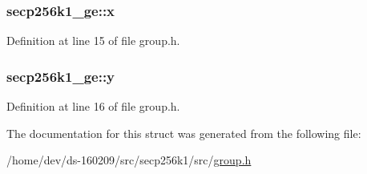 \subsubsection[{x}]{ secp256k1\+\_\+ge\+::x}\label{structsecp256k1__ge_a3c04a97b606c82ea87e55d4a06f06b6e}


Definition at line 15 of file group.\+h.

\hypertarget{structsecp256k1__ge_a604295983a1f4aa6e8b5b0f1e46f9ee0}{}
\subsubsection[{y}]{ secp256k1\+\_\+ge\+::y}\label{structsecp256k1__ge_a604295983a1f4aa6e8b5b0f1e46f9ee0}


Definition at line 16 of file group.\+h.



The documentation for this struct was generated from the following file\+:\begin{DoxyCompactItemize}
\item 
/home/dev/ds-\/160209/src/secp256k1/src/\hyperlink{group_8h}{group.\+h}\end{DoxyCompactItemize}
